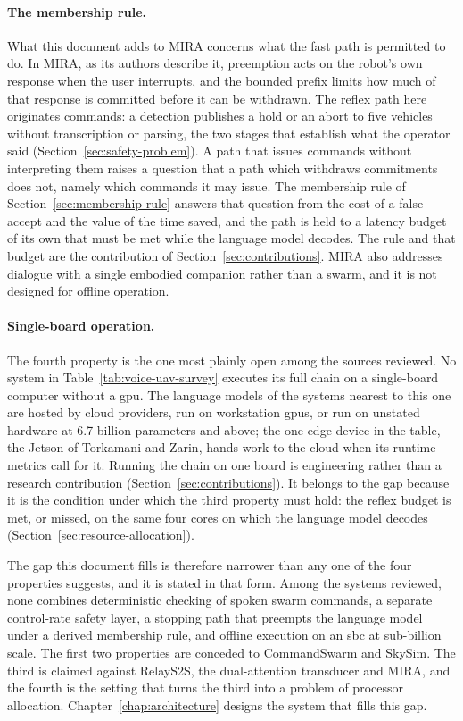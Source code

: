 \paragraph{The membership rule.} What this document adds to MIRA concerns what the fast path is
permitted to do. In MIRA, as its authors describe it, preemption acts on the robot's own response
when the user interrupts, and the bounded prefix limits how much of that response is committed before
it can be withdrawn. The reflex path here originates commands: a detection publishes a hold or an
abort to five vehicles without transcription or parsing, the two stages that establish what the
operator said (Section~\ref{sec:safety-problem}). A path that issues commands without interpreting
them raises a question that a path which withdraws commitments does not, namely which commands it
may issue. The membership rule of Section~\ref{sec:membership-rule} answers that question from the
cost of a false accept and the value of the time saved, and the path is held to a latency budget of
its own that must be met while the language model decodes. The rule and that budget are the
contribution of Section~\ref{sec:contributions}. MIRA also addresses dialogue with a single embodied
companion rather than a swarm, and it is not designed for offline operation.

\paragraph{Single-board operation.} The fourth property is the one most plainly open among the sources
reviewed. No system in Table~\ref{tab:voice-uav-survey} executes its full chain on a single-board
computer without a \gls{gpu}. The language models of the systems nearest to this one are hosted by
cloud providers, run on workstation \glspl{gpu}, or run on unstated hardware at 6.7 billion
parameters and above; the one edge device in the table, the Jetson of Torkamani and Zarin, hands
work to the cloud when its runtime metrics call for it. Running the chain on one board is
engineering rather than a research contribution (Section~\ref{sec:contributions}). It belongs to
the gap because it is the condition under which the third property must hold: the reflex budget is
met, or missed, on the same four cores on which the language model decodes
(Section~\ref{sec:resource-allocation}).

The gap this document fills is therefore narrower than any one of the four properties suggests, and
it is stated in that form. Among the systems reviewed, none combines deterministic checking of
spoken swarm commands, a separate control-rate safety layer, a stopping path that preempts the
language model under a derived membership rule, and offline execution on an \gls{sbc} at
sub-billion scale. The first two properties are conceded to CommandSwarm and SkySim. The third is
claimed against RelayS2S, the dual-attention transducer and MIRA, and the fourth is the setting that
turns the third into a problem of processor allocation. Chapter~\ref{chap:architecture} designs the
system that fills this gap.
